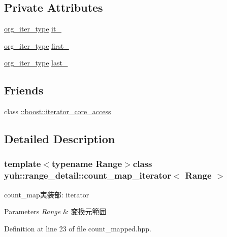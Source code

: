 \subsection*{\-Private \-Attributes}
\begin{DoxyCompactItemize}
\item 
\hyperlink{classyuh_1_1range__detail_1_1count__map__iterator_a7d85ad9a5f85d7a869dd7ea9557eee8b}{org\-\_\-iter\-\_\-type} \hyperlink{classyuh_1_1range__detail_1_1count__map__iterator_a2946c4f061baf69bfb5b2cc1dcd80a28}{it\-\_\-}
\item 
\hyperlink{classyuh_1_1range__detail_1_1count__map__iterator_a7d85ad9a5f85d7a869dd7ea9557eee8b}{org\-\_\-iter\-\_\-type} \hyperlink{classyuh_1_1range__detail_1_1count__map__iterator_a9296ec46eb2f6c43cf6c5263aaf54cca}{first\-\_\-}
\item 
\hyperlink{classyuh_1_1range__detail_1_1count__map__iterator_a7d85ad9a5f85d7a869dd7ea9557eee8b}{org\-\_\-iter\-\_\-type} \hyperlink{classyuh_1_1range__detail_1_1count__map__iterator_a9d115442fe366e570c20b178cc577690}{last\-\_\-}
\end{DoxyCompactItemize}
\subsection*{\-Friends}
\begin{DoxyCompactItemize}
\item 
class \hyperlink{classyuh_1_1range__detail_1_1count__map__iterator_a986bf0deaa7559f361d03122eeea4c86}{\-::boost\-::iterator\-\_\-core\-\_\-access}
\end{DoxyCompactItemize}


\subsection{\-Detailed \-Description}
\subsubsection*{template$<$typename Range$>$class yuh\-::range\-\_\-detail\-::count\-\_\-map\-\_\-iterator$<$ Range $>$}

count\-\_\-map実装部\-: iterator 
\begin{DoxyParams}{\-Parameters}
{\em \-Range} & 変換元範囲 \\
\hline
\end{DoxyParams}


\-Definition at line 23 of file count\-\_\-mapped.\-hpp.



